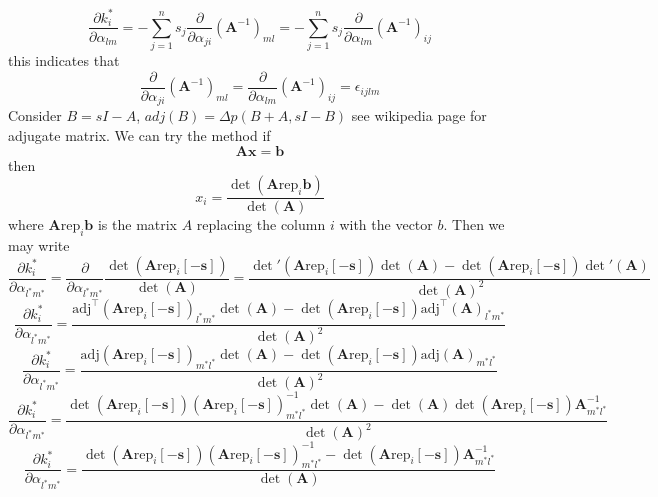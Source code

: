 \documentclass[journal=jcisd8,manuscript=article,layout=onecolumn,pdftex,floatfix,amsmath,amssymb,10pt]{achemso}
\begin{document}
$$
\frac{\partial k_i^*}{\partial \alpha_{lm}} = - \sum_{j=1}^n s_j \frac{\partial}{\partial \alpha_{ji}} (\mathbf{A}^{-1})_{ml} = - \sum_{j=1}^n s_j \frac{\partial}{\partial \alpha_{lm}} (\mathbf{A}^{-1})_{ij}
$$
this indicates that
$$
\frac{\partial}{\partial \alpha_{ji}} (\mathbf{A}^{-1})_{ml} = \frac{\partial}{\partial \alpha_{lm}} (\mathbf{A}^{-1})_{ij} = \epsilon_{ijlm}
$$
Consider $B=sI-A$, $adj(B)=\Delta p(B+A,sI-B)$ see wikipedia page for adjugate matrix.
We can try the method if
$$
\mathbf{A}\mathbf{x} = \mathbf{b}
$$
then
$$
x_i = \frac{\det(\mathbf{A} \mathrm{rep}_i \mathbf{b})}{\det(\mathbf{A})}
$$
where $\mathbf{A} \mathrm{rep}_i \mathbf{b}$ is the matrix $A$ replacing the column $i$ with the vector $b$. Then we may write \begin{equation}
\frac{\partial k^*_i}{\partial \alpha_{l^* m^*}} = \frac{\partial}{\partial \alpha_{l^* m^*}} \frac{\det(\mathbf{A}\mathrm{rep}_i[-\mathbf{s}])}{\det(\mathbf{A})} = \frac{\det'(\mathbf{A}\mathrm{rep}_i[-\mathbf{s}])\det(\mathbf{A}) - \det(\mathbf{A}\mathrm{rep}_i[-\mathbf{s}])\det'(\mathbf{A})}{\det(\mathbf{A})^2}
\end{equation}
\begin{equation}
\frac{\partial k^*_i}{\partial \alpha_{l^* m^*}} = \frac{\mathrm{adj}^\top(\mathbf{A}\mathrm{rep}_i[-\mathbf{s}])_{l^*m^*}\det(\mathbf{A}) - \det(\mathbf{A}\mathrm{rep}_i[-\mathbf{s}])\mathrm{adj}^\top(\mathbf{A})_{l^*m^*}}{\det(\mathbf{A})^2}
\end{equation}
\begin{equation}
\frac{\partial k^*_i}{\partial \alpha_{l^* m^*}} = \frac{\mathrm{adj}(\mathbf{A}\mathrm{rep}_i[-\mathbf{s}])_{m^*l^*}\det(\mathbf{A}) - \det(\mathbf{A}\mathrm{rep}_i[-\mathbf{s}])\mathrm{adj}(\mathbf{A})_{m^*l^*}}{\det(\mathbf{A})^2}
\end{equation}
\begin{equation}
\frac{\partial k^*_i}{\partial \alpha_{l^* m^*}} = \frac{\det(\mathbf{A}\mathrm{rep}_i[-\mathbf{s}])(\mathbf{A}\mathrm{rep}_i[-\mathbf{s}])^{-1}_{m^*l^*}\det(\mathbf{A}) - \det(\mathbf{A})\det(\mathbf{A}\mathrm{rep}_i[-\mathbf{s}])\mathbf{A}^{-1}_{m^*l^*}}{\det(\mathbf{A})^2}
\end{equation}
\begin{equation}
\frac{\partial k^*_i}{\partial \alpha_{l^* m^*}} = \frac{\det(\mathbf{A}\mathrm{rep}_i[-\mathbf{s}])(\mathbf{A}\mathrm{rep}_i[-\mathbf{s}])^{-1}_{m^*l^*} - \det(\mathbf{A}\mathrm{rep}_i[-\mathbf{s}])\mathbf{A}^{-1}_{m^*l^*}}{\det(\mathbf{A})}
\end{equation}
\end{document}
